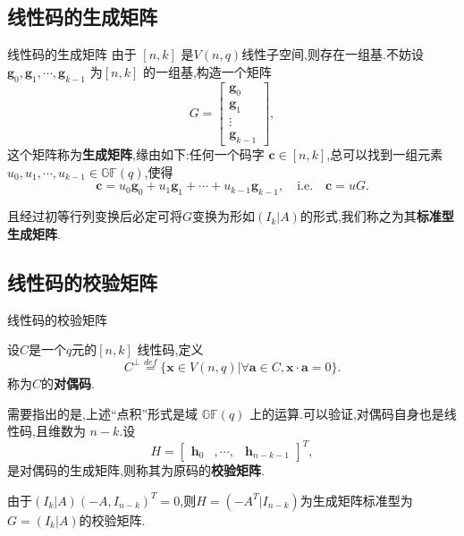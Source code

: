 \documentclass{beamer}
\begin{document}
	\subsection{线性码的生成矩阵}
	\begin{frame}{线性码的生成矩阵}
		由于 $[n, k]$ 是$V(n,q)$线性子空间,则存在一组基.不妨设${\mathbf{g}_0, \mathbf{g}_1, \cdots, \mathbf{g}_{k-1}}$ 为$[n, k]$ 的一组基,构造一个矩阵
		\[ G = \left[ \begin{array}{c} \mathbf{g}_0 \\  \mathbf{g}_1 \\  \vdots \\  \mathbf{g}_{k-1} \end{array} \right], \] 这个矩阵称为\textbf{生成矩阵},缘由如下:任何一个码字 $\mathbf{c} \in [n, k]$,总可以找到一组元素 $u_0, u_1, \cdots, u_{k-1} \in \mathbb{GF}(q)$,使得
		\[ \mathbf{c} = u_0 \mathbf{g}_0 + u_1 \mathbf{g}_1 + \cdots + u_{k-1} \mathbf{g}_{k-1}, \quad \text{i.e.} \quad \mathbf{c} = uG. \]
		
		且经过初等行列变换后必定可将$G$变换为形如$(I_k|A)$的形式,我们称之为其\textbf{标准型生成矩阵}.
	\end{frame}
	\subsection{线性码的校验矩阵}
	\begin{frame}{线性码的校验矩阵}
		\begin{definition}[线性码的对偶码]
			\qquad 设$C$是一个$q$元的$[n, k]$ 线性码,定义
			$$C^\perp\overset{def}{=}\{\mathbf{x}\in V(n,q)|\forall \mathbf{a}\in C,\mathbf{x}\cdot \mathbf{a}=0\}.$$
			称为$C$的\textbf{对偶码}.
		\end{definition}
		
		需要指出的是,上述“点积”形式是域 $\mathbb{GF}(q)$ 上的运算.可以验证,对偶码自身也是线性码,且维数为 $n - k$.设
		\[ H = \left[ \begin{array}{ccc} \mathbf{h}_0& , \cdots ,& \mathbf{h}_{n-k-1} \end{array} \right]^T, \]
		是对偶码的生成矩阵,则称其为原码的\textbf{校验矩阵}.
		
		由于$(I_k|A)\left(-A,I_{n-k}\right)^T=0$,则$H=(-A^T|I_{n-k})$为生成矩阵标准型为$G=(I_k|A)$的校验矩阵.
	\end{frame}
\end{document}
